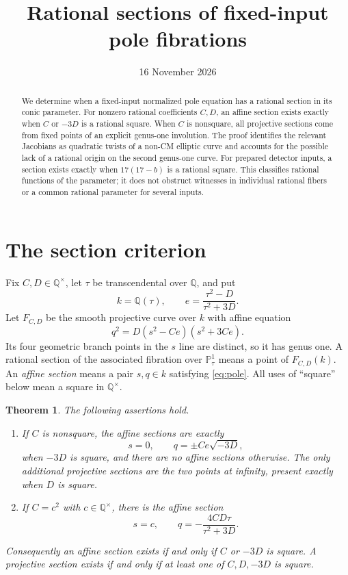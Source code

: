 \documentclass[11pt,a4paper]{article}
\title{Rational sections of fixed-input pole fibrations}
\author{}\date{16 November 2026}
\newtheorem{theorem}{Theorem}[section]
\newcommand{\Q}{\mathbb Q}\newcommand{\Z}{\mathbb Z}
\newcommand{\Pp}{\mathbb P}
\begin{document}
\maketitle
\begin{abstract}
We determine when a fixed-input normalized pole equation has a rational
section in its conic parameter. For nonzero rational coefficients $C,D$,
an affine section exists exactly when $C$ or $-3D$ is a rational square.
When $C$ is nonsquare, all projective sections come from fixed points
of an explicit genus-one involution. The proof identifies the relevant
Jacobians as quadratic twists of a non-CM elliptic curve and accounts
for the possible lack of a rational origin on the second genus-one
curve. For prepared detector inputs, a section exists exactly when
$17(17-b)$ is a rational square. This classifies rational functions
of the parameter; it does not obstruct witnesses in individual rational
fibers or a common rational parameter for several inputs.
\end{abstract}

\section{The section criterion}

Fix $C,D\in\Q^\times$, let $\tau$ be transcendental over $\Q$, and put
\[
 k=\Q(\tau),\qquad e=\frac{\tau^2-D}{\tau^2+3D}.
\]
Let $F_{C,D}$ be the smooth projective curve over $k$ with affine equation
\begin{equation}\label{eq:pole}
                 q^2=D(s^2-Ce)(s^2+3Ce).
\end{equation}
Its four geometric branch points in the $s$ line are distinct, so it
has genus one. A rational section of the associated fibration over
$\Pp^1_\tau$ means a point of $F_{C,D}(k)$. An \emph{affine section}
means a pair $s,q\in k$ satisfying \eqref{eq:pole}.
All uses of ``square'' below mean a square in $\Q^\times$.

\begin{theorem}\label{thm:sections}
The following assertions hold.
\begin{enumerate}
\item If $C$ is nonsquare, the affine sections are exactly
\begin{equation}\label{eq:fixedzero}
              s=0,\qquad q=\pm Ce\sqrt{-3D},
\end{equation}
when $-3D$ is square, and there are no affine sections otherwise.
The only additional projective sections are the two points at infinity,
present exactly when $D$ is square.
\item If $C=c^2$ with $c\in\Q^\times$, there is the affine section
\begin{equation}\label{eq:squaresection}
             s=c,\qquad q=-\frac{4CD\tau}{\tau^2+3D}.
\end{equation}
\end{enumerate}
Consequently an affine section exists if and only if $C$ or $-3D$
is square. A projective section exists if and only if at least one
of $C,D,-3D$ is square.
\end{theorem}
\end{document}
